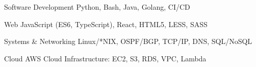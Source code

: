 

\begin{cvskills}

  \cvskill
    {Software Development} %
    {Python, Bash, Java, Golang, CI/CD} %

  \cvskill
    {Web} %
    {JavaScript (ES6, TypeScript), React, HTML5, LESS, SASS} %

  \cvskill
    {Systems \& Networking} %
    {Linux/*NIX, OSPF/BGP, TCP/IP, DNS, SQL/NoSQL} %


  \cvskill
    {Cloud} %
    {AWS Cloud Infrastructure: EC2, S3, RDS, VPC, Lambda} %

\end{cvskills}
